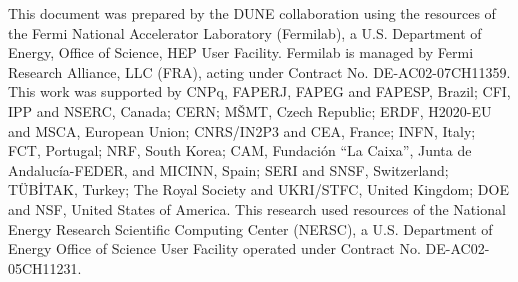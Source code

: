 \begin{acknowledgements}
This document was prepared by the DUNE collaboration using the
resources of the Fermi National Accelerator Laboratory 
(Fermilab), a U.S. Department of Energy, Office of Science, 
HEP User Facility. Fermilab is managed by Fermi Research Alliance, 
LLC (FRA), acting under Contract No. DE-AC02-07CH11359.
%
%
This work was supported by
CNPq,
FAPERJ,
FAPEG and 
FAPESP,                         Brazil;
CFI, 
IPP and 
NSERC,                          Canada;
CERN;
M\v{S}MT,                       Czech Republic;
ERDF, 
H2020-EU and 
MSCA,                           European Union;
CNRS/IN2P3 and
CEA,                            France;
INFN,                           Italy;
FCT,                            Portugal;
NRF,                            South Korea;
CAM, 
Fundaci\'{o}n ``La Caixa'',
Junta de Andaluc\'ia-FEDER, and 
MICINN,                         Spain;
SERI and 
SNSF,                           Switzerland;
T\"UB\.ITAK,                    Turkey;
The Royal Society and 
UKRI/STFC,                      United Kingdom;
DOE and 
NSF,                            United States of America.
This research used resources of the 
National Energy Research Scientific Computing Center (NERSC), 
a U.S. Department of Energy Office of Science User Facility 
operated under Contract No. DE-AC02-05CH11231.
\end{acknowledgements}
